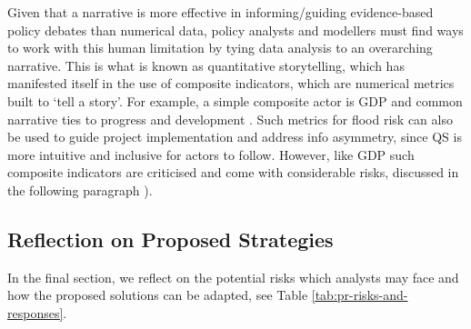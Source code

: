 Given that a narrative is more effective in informing/guiding evidence-based policy debates than numerical data, policy analysts and modellers must find ways to work with this human limitation by tying data analysis to an overarching narrative. This is what is known as quantitative storytelling, which has manifested itself in the use of composite indicators, which are numerical metrics built to ‘tell a story’. For example, a simple composite actor is GDP and common narrative ties to progress and development \parencite{kuc-czarnecka_quantitative_2020}. Such metrics for flood risk can also be used to guide project implementation and address info asymmetry, since QS is more intuitive and inclusive for actors to follow. However, like GDP such composite indicators are criticised and come with considerable risks, discussed in the following paragraph \parencite{kuc-czarnecka_quantitative_2020}).

\subsection{Reflection on Proposed Strategies}

In the final section, we reflect on the potential risks which analysts may face and how the proposed solutions can be adapted, see Table \ref{tab:pr-risks-and-responses}.

\bigskip

